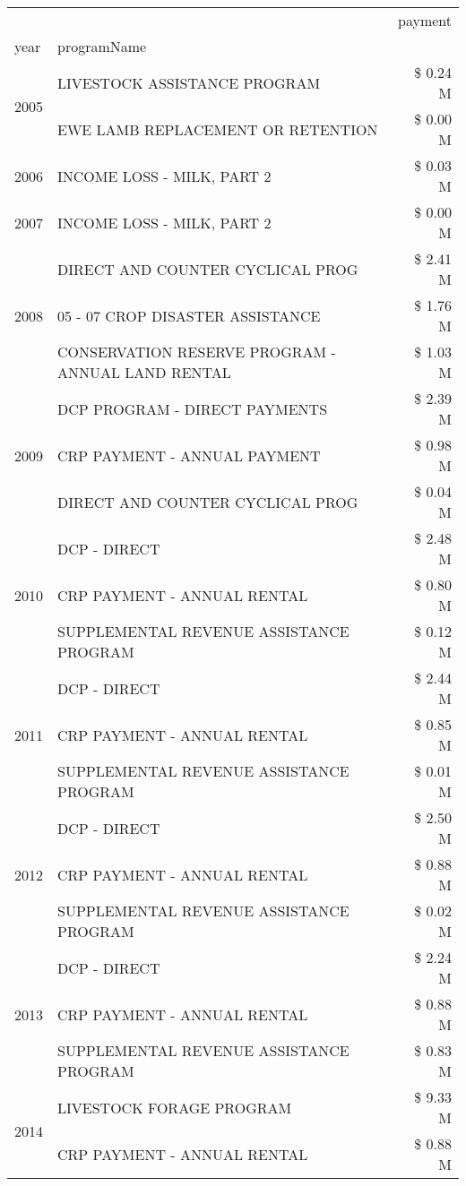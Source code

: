 \begin{tabular}{llr}
\toprule
 &  & payment \\
year & programName &  \\
\midrule
\multirow[t]{2}{*}{2005} & LIVESTOCK ASSISTANCE PROGRAM & \$ 0.24 M \\
 & EWE LAMB REPLACEMENT OR RETENTION & \$ 0.00 M \\
\cline{1-3}
2006 & INCOME LOSS - MILK, PART 2 & \$ 0.03 M \\
\cline{1-3}
2007 & INCOME LOSS - MILK, PART 2 & \$ 0.00 M \\
\cline{1-3}
\multirow[t]{3}{*}{2008} & DIRECT AND COUNTER CYCLICAL PROG & \$ 2.41 M \\
 & 05 - 07 CROP DISASTER ASSISTANCE & \$ 1.76 M \\
 & CONSERVATION RESERVE PROGRAM - ANNUAL LAND RENTAL & \$ 1.03 M \\
\cline{1-3}
\multirow[t]{3}{*}{2009} & DCP PROGRAM - DIRECT PAYMENTS & \$ 2.39 M \\
 & CRP PAYMENT - ANNUAL PAYMENT & \$ 0.98 M \\
 & DIRECT AND COUNTER CYCLICAL PROG & \$ 0.04 M \\
\cline{1-3}
\multirow[t]{3}{*}{2010} & DCP - DIRECT & \$ 2.48 M \\
 & CRP PAYMENT - ANNUAL RENTAL & \$ 0.80 M \\
 & SUPPLEMENTAL REVENUE ASSISTANCE PROGRAM & \$ 0.12 M \\
\cline{1-3}
\multirow[t]{3}{*}{2011} & DCP - DIRECT & \$ 2.44 M \\
 & CRP PAYMENT - ANNUAL RENTAL & \$ 0.85 M \\
 & SUPPLEMENTAL REVENUE ASSISTANCE PROGRAM & \$ 0.01 M \\
\cline{1-3}
\multirow[t]{3}{*}{2012} & DCP - DIRECT & \$ 2.50 M \\
 & CRP PAYMENT - ANNUAL RENTAL & \$ 0.88 M \\
 & SUPPLEMENTAL REVENUE ASSISTANCE PROGRAM & \$ 0.02 M \\
\cline{1-3}
\multirow[t]{3}{*}{2013} & DCP - DIRECT & \$ 2.24 M \\
 & CRP PAYMENT - ANNUAL RENTAL & \$ 0.88 M \\
 & SUPPLEMENTAL REVENUE ASSISTANCE PROGRAM & \$ 0.83 M \\
\cline{1-3}
\multirow[t]{3}{*}{2014} & LIVESTOCK FORAGE PROGRAM & \$ 9.33 M \\
 & CRP PAYMENT - ANNUAL RENTAL & \$ 0.88 M \\

\end{tabular}
